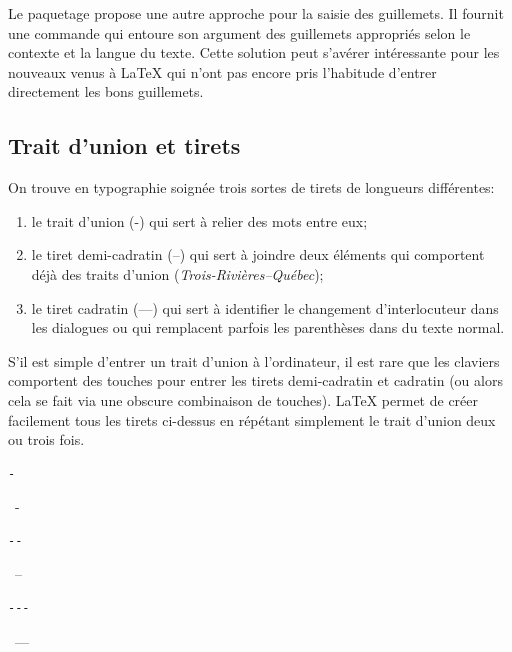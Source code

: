 {Le paquetage  \citep{csquotes} propose une autre approche
pour la saisie des guillemets. Il fournit une commande
\cmdprint{\enquote} qui entoure son argument des guillemets appropriés
selon le contexte et la langue du texte. Cette solution peut s'avérer
intéressante pour les nouveaux venus à {\LaTeX} qui n'ont pas encore
pris l'habitude d'entrer directement les bons guillemets.

\subsection{Trait d'union et tirets}
\label{sec:bases:caracteres:tirets}

On trouve en typographie soignée trois sortes de tirets de longueurs
différentes:
\begin{enumerate}
\item le trait d'union (-) qui sert à relier des mots entre eux;
\item le tiret demi-cadratin (--) qui sert à joindre deux éléments qui
  comportent déjà des traits d'union (\emph{Trois-Rivières--Québec});
\item le tiret cadratin (---) qui sert à identifier le changement
  d'interlocuteur dans les dialogues ou qui remplacent parfois les
  parenthèses dans du texte normal.
\end{enumerate}

S'il est simple d'entrer un trait d'union à l'ordinateur, il est rare
que les claviers comportent des touches pour entrer les tirets
demi-cadratin et cadratin (ou alors cela se fait via une obscure
combinaison de touches). {\LaTeX} permet de créer facilement tous les
tirets ci-dessus en répétant simplement le trait d'union deux ou trois
fois.
\begin{demo}
  \begin{minipage}{0.2\linewidth}
    \begin{texample}
\begin{lstlisting}
-
\end{lstlisting}
      \producing\ -
    \end{texample}
  \end{minipage}
  \hfill
  \begin{minipage}{0.2\linewidth}
    \begin{texample}
\begin{lstlisting}
--
\end{lstlisting}
      \producing\ --
    \end{texample}
  \end{minipage}
  \hfill
  \begin{minipage}{0.2\linewidth}
    \begin{texample}
\begin{lstlisting}
---
\end{lstlisting}
      \producing\ ---
    \end{texample}
  \end{minipage}
\end{demo}

}
